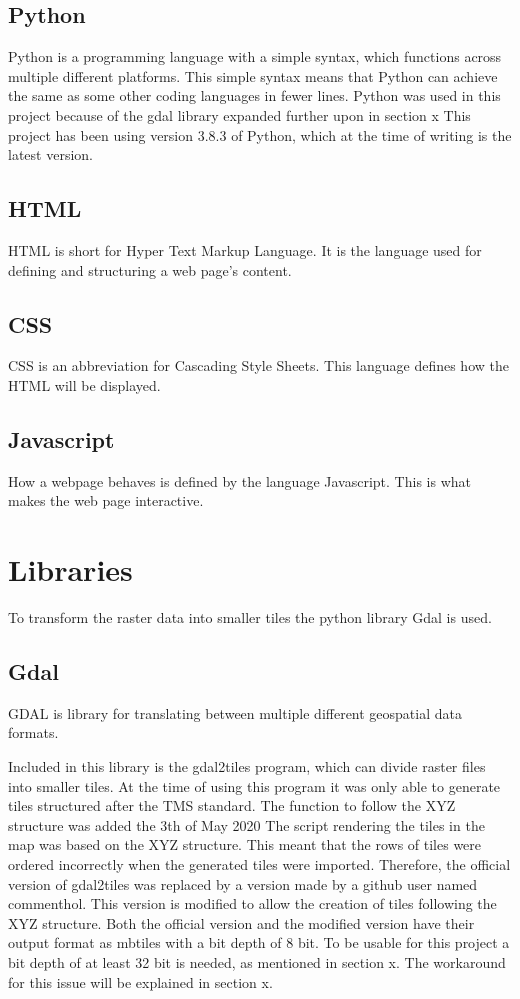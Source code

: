 \subsection*{Python}
Python is a programming language with a simple syntax, which functions across multiple different platforms. This simple syntax means that Python can achieve the same as some other coding languages in fewer lines.\citep{WhatIsPython}
Python was used in this project because of the gdal library expanded further upon in section x
This project has been using version 3.8.3 of Python, which at the time of writing is the latest version. \citep{PythonVersion}
\subsection*{HTML}
HTML is short for Hyper Text Markup Language. It is the language used for defining and structuring a web page’s content.
\subsection*{CSS}
CSS is an abbreviation for Cascading Style Sheets. This language defines how the HTML will be displayed.
\subsection*{Javascript}
How a webpage behaves is defined by the language Javascript.  This is what makes the web page interactive. 
\citep{WhatIsJs}

\section{Libraries}
To transform the raster data into smaller tiles the python library Gdal is used. 
\subsection*{Gdal}
GDAL is library for translating between multiple different geospatial data formats. \citep{GDAL} 

Included in this library is the gdal2tiles program, which can divide raster files into smaller tiles. 
At the time of using this program it was only able to generate tiles structured after the TMS standard. The function to follow the XYZ structure was added the 3th of May 2020 \citep{gdal2tilesDoc} \citep{GdalRelease}
%
The script rendering the tiles in the map was based on the XYZ structure. This meant that the rows of tiles were ordered incorrectly when the generated tiles were imported. Therefore, the official version of gdal2tiles was replaced by a version made by a github user named commenthol. This version is modified to allow the creation of tiles following the XYZ structure. \citep{gdalLeaflet}
Both the official version and the modified version have their output format as mbtiles with a bit depth of 8 bit. To be usable for this project a bit depth of at least 32 bit is needed, as mentioned in section x. The workaround for this issue will be explained in section x. 
